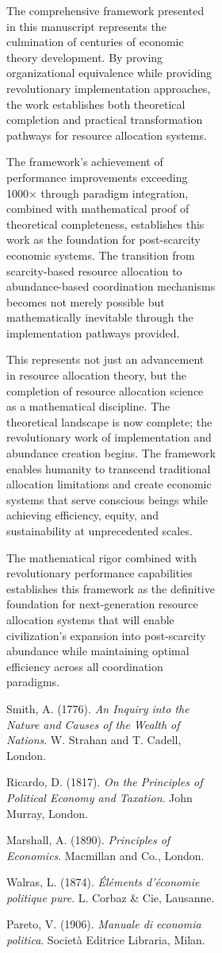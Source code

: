 \documentclass[12pt,a4paper]{article}
\begin{document}
\begin{figure}[H]
\begin{figure}[H]
\begin{figure}[H]
The comprehensive framework presented in this manuscript represents the culmination of centuries of economic theory development. By proving organizational equivalence while providing revolutionary implementation approaches, the work establishes both theoretical completion and practical transformation pathways for resource allocation systems.

The framework's achievement of performance improvements exceeding 1000× through paradigm integration, combined with mathematical proof of theoretical completeness, establishes this work as the foundation for post-scarcity economic systems. The transition from scarcity-based resource allocation to abundance-based coordination mechanisms becomes not merely possible but mathematically inevitable through the implementation pathways provided.

This represents not just an advancement in resource allocation theory, but the completion of resource allocation science as a mathematical discipline. The theoretical landscape is now complete; the revolutionary work of implementation and abundance creation begins. The framework enables humanity to transcend traditional allocation limitations and create economic systems that serve conscious beings while achieving efficiency, equity, and sustainability at unprecedented scales.

The mathematical rigor combined with revolutionary performance capabilities establishes this framework as the definitive foundation for next-generation resource allocation systems that will enable civilization's expansion into post-scarcity abundance while maintaining optimal efficiency across all coordination paradigms.


\begin{thebibliography}{99}

 Smith, A. (1776). \textit{An Inquiry into the Nature and Causes of the Wealth of Nations}. W. Strahan and T. Cadell, London.

 Ricardo, D. (1817). \textit{On the Principles of Political Economy and Taxation}. John Murray, London.

 Marshall, A. (1890). \textit{Principles of Economics}. Macmillan and Co., London.

 Walras, L. (1874). \textit{Éléments d'économie politique pure}. L. Corbaz \& Cie, Lausanne.

 Pareto, V. (1906). \textit{Manuale di economia politica}. Società Editrice Libraria, Milan.


\end{thebibliography}
\end{figure}
\end{figure}
\end{figure}
\end{document}
